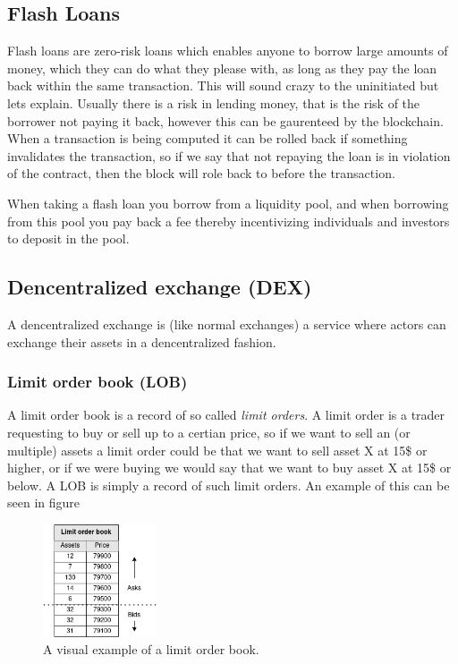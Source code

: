 \subsection{Flash Loans}
Flash loans are zero-risk loans which enables anyone to borrow large amounts of money, which they can do what they please with, as long as they pay the loan back within the same transaction. This will sound crazy to the uninitiated but lets explain. Usually there is a risk in lending money, that is the risk of the borrower not paying it back, however this can be gaurenteed by the blockchain. When a transaction is being computed it can be rolled back if something invalidates the transaction, so if we say that not repaying the loan is in violation of the contract, then the block will role back to before the transaction.

When taking a flash loan you borrow from a liquidity pool, and when borrowing from this pool you pay back a fee thereby incentivizing individuals and investors to deposit in the pool.

\subsection{Dencentralized exchange (DEX)}
A dencentralized exchange is (like normal exchanges) a service where actors can exchange their assets in a dencentralized fashion.

\subsubsection{Limit order book (LOB)}
A limit order book is a record of so called \textit{limit orders}. A limit order is a trader requesting to buy or sell up to a certian price, so if we want to sell an (or multiple) assets a limit order could be that we want to sell asset X at 15\$ or higher, or if we were buying we would say that we want to buy asset X at 15\$ or below. A LOB is simply a record of such limit orders. An example of this can be seen in figure
\begin{figure}[h]
  \centering
  \includegraphics[width=0.3\textwidth]{assests/Flash-loans-LOB}
  \caption{A visual example of a limit order book.}
  \label{fig:LOB}
\end{figure}


